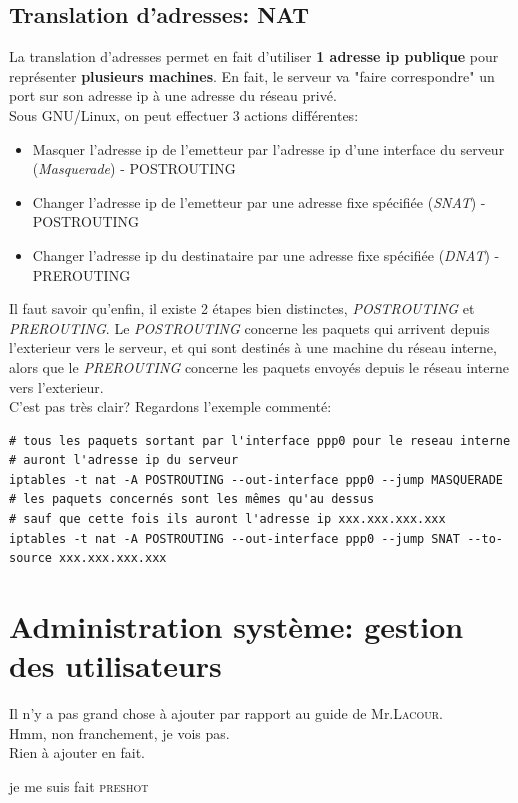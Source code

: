 \documentclass{article}
\begin{document}
\subsection{Translation d'adresses: NAT}
La translation d'adresses permet en fait d'utiliser \textbf{1 adresse ip publique} pour représenter \textbf{plusieurs machines}.  En fait, le serveur va "faire correspondre" un port sur son adresse ip à une adresse du réseau privé.\\
Sous GNU/Linux, on peut effectuer 3 actions différentes:
\begin{itemize}
\item{Masquer l'adresse ip de l'emetteur par l'adresse ip d'une interface du serveur (\emph{Masquerade}) - POSTROUTING}
\item{Changer l'adresse ip de l'emetteur par une adresse fixe spécifiée (\emph{SNAT}) - POSTROUTING}
\item{Changer l'adresse ip du destinataire par une adresse fixe spécifiée (\emph{DNAT}) - PREROUTING}
\end{itemize}
Il faut savoir qu'enfin, il existe 2 étapes bien distinctes, \emph{POSTROUTING} et \emph{PREROUTING}. Le \emph{POSTROUTING} concerne les paquets qui arrivent depuis l'exterieur vers le serveur, et qui sont destinés à une machine du réseau interne, alors que le \emph{PREROUTING} concerne les paquets envoyés depuis le réseau interne vers l'exterieur.\\
C'est pas très clair? Regardons l'exemple commenté:
\begin{verbatim}
# tous les paquets sortant par l'interface ppp0 pour le reseau interne 
# auront l'adresse ip du serveur
iptables -t nat -A POSTROUTING --out-interface ppp0 --jump MASQUERADE
# les paquets concernés sont les mêmes qu'au dessus
# sauf que cette fois ils auront l'adresse ip xxx.xxx.xxx.xxx
iptables -t nat -A POSTROUTING --out-interface ppp0 --jump SNAT --to-source xxx.xxx.xxx.xxx
\end{verbatim}

\section{Administration système: gestion des utilisateurs}
Il n'y a pas grand chose à ajouter par rapport au guide de Mr.\textsc{Lacour}.\\
Hmm, non franchement, je vois pas.\\
Rien à ajouter en fait.\\

\begin{center}
je me suis fait \textsc{preshot}
\end{center}
\end{document}
